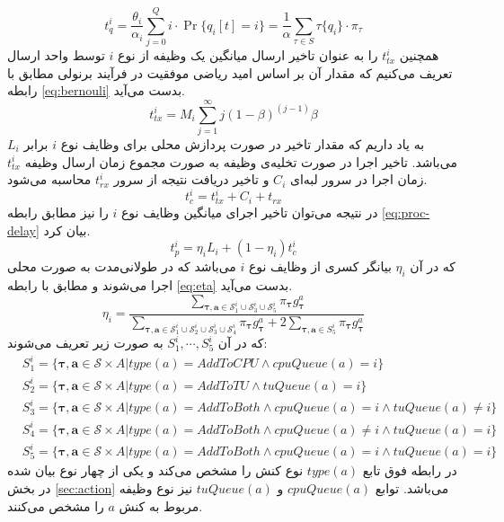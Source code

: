 \begin{equation}
	\label{eq:queuing-delay}
	t_{q}^i=\frac{\theta_i}{\alpha_i} \sum_{j=0}^{Q} i \cdot \operatorname{Pr}\{q_i[t]=i\}=\frac{1}{\alpha} \sum_{\tau \in S} \tau\{q_i\} \cdot \pi_{\tau}
\end{equation}
همچنین $t_{tx}^i$ را به عنوان تاخیر ارسال میانگین یک وظیفه از نوع \(i\) توسط واحد ارسال تعریف می‌کنیم که مقدار آن بر اساس امید ریاضی موفقیت در فرآیند برنولی مطابق با رابطه \ref{eq:bernouli} بدست می‌آید.
\begin{equation}
	\label{eq:bernouli}
	t_{t x}^i=M_i \sum_{j=1}^{\infty} j(1-\beta)^{(j-1)} \beta
\end{equation}
به یاد داریم که مقدار تاخیر در صورت پردازش محلی برای وظایف نوع $i$ برابر $L_i$ می‌باشد. تاخیر اجرا در صورت تخلیه‌ی وظیفه به صورت مجموع زمان ارسال وظیفه
$t_{tx}^i$
زمان اجرا در سرور لبه‌ای
$C_i$
و تاخیر دریافت نتیجه از سرور
$t_{rx}^i$
محاسبه می‌شود.
\begin{equation}
	t_{c}^i=t_{t x}^i+C_i+t_{rx}
\end{equation}
در نتیجه می‌توان تاخیر اجرای میانگین وظایف نوع $i$ را نیز مطابق رابطه \ref{eq:proc-delay} بیان کرد.
\begin{equation}
	\label{eq:proc-delay}
	t_{p}^i=\eta_i L_i+(1-\eta_i) t_{c}^i
\end{equation}
که در آن
$\eta_i$
بیانگر کسری از وظایف نوع $i$ می‌باشد که در طولانی‌مدت به صورت محلی اجرا می‌شوند و مطابق با رابطه \ref{eq:eta} بدست می‌آيد.
\begin{equation}
	\label{eq:eta}
	\eta_i=\frac{\sum_{\boldsymbol{\tau, a} \in \mathcal{S}_{1}^i\cup\mathcal{S}_{3}^i\cup\mathcal{S}_{5}^i} \pi_{\boldsymbol{\tau}} g_{\boldsymbol{\tau}}^{a} }{\sum_{\boldsymbol{\tau, a} \in \mathcal{S}_{1}^i\cup\mathcal{S}_{2}^i\cup\mathcal{S}_{3}^i\cup\mathcal{S}_{4}^i} \pi_{\boldsymbol{\tau}} g_{\boldsymbol{\tau}}^{a} + 2 \sum_{\boldsymbol{\tau, a} \in S_5^i} \pi_{\boldsymbol{\tau}} g_{\boldsymbol{\tau}}^{a}}
\end{equation}
که در آن
$S_1^i, \cdots, S_5^i$
به صورت زیر تعریف می‌شوند:
\begin{equation}
	\begin{aligned}
		& S_1^i = \{\boldsymbol{\tau, a} \in \mathcal{S} \times A | type(a) = AddToCPU \land cpuQueue(a) = i\} \\
		& S_2^i = \{\boldsymbol{\tau, a} \in \mathcal{S} \times A | type(a) = AddToTU \land tuQueue(a) = i\} \\ 
		& S_3^i = \{\boldsymbol{\tau, a} \in \mathcal{S} \times A | type(a) = AddToBoth \land cpuQueue(a) = i \land tuQueue(a) \neq i\} \\
		& S_4^i = \{\boldsymbol{\tau, a} \in \mathcal{S} \times A | type(a) = AddToBoth \land cpuQueue(a) \neq i \land tuQueue(a) = i\} \\
		& S_5^i = \{\boldsymbol{\tau, a} \in \mathcal{S} \times A | type(a) = AddToBoth \land cpuQueue(a) = i \land tuQueue(a) = i\}
	\end{aligned}
\end{equation}
در رابطه فوق تابع $type(a)$ نوع کنش را مشخص می‌کند و یکی از چهار نوع بیان شده در بخش \ref{sec:action} می‌باشد. توابع
$cpuQueue(a)$
و
$tuQueue(a)$
نیز نوع وظیفه مربوط به کنش $a$ را مشخص می‌کنند. \\

